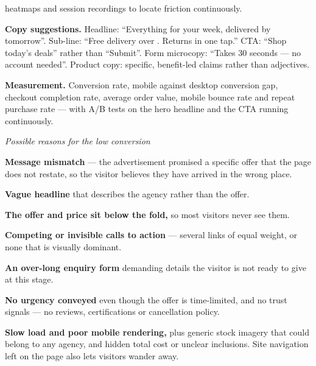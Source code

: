 \begin{qlist}
\begin{apts}
      heatmaps and session recordings to locate friction continuously.
\item \textbf{Copy suggestions.} Headline: ``Everything for your week, delivered
      by tomorrow''. Sub-line: ``Free delivery over . Returns in one
      tap.'' CTA: ``Shop today's deals'' rather than ``Submit''. Form microcopy:
      ``Takes 30 seconds --- no account needed''. Product copy: specific,
      benefit-led claims rather than adjectives.
\item \textbf{Measurement.} Conversion rate, mobile against desktop conversion
      gap, checkout completion rate, average order value, mobile bounce rate and
      repeat purchase rate --- with A/B tests on the hero headline and the CTA
      running continuously.
\end{apts}

\textit{Possible reasons for the low conversion}
\begin{apts}
\item \textbf{Message mismatch} --- the advertisement promised a specific offer
      that the page does not restate, so the visitor believes they have arrived
      in the wrong place.
\item \textbf{Vague headline} that describes the agency rather than the offer.
\item \textbf{The offer and price sit below the fold,} so most visitors never
      see them.
\item \textbf{Competing or invisible calls to action} --- several links of equal
      weight, or none that is visually dominant.
\item \textbf{An over-long enquiry form} demanding details the visitor is not
      ready to give at this stage.
\item \textbf{No urgency conveyed} even though the offer is time-limited, and no
      trust signals --- no reviews, certifications or cancellation policy.
\item \textbf{Slow load and poor mobile rendering,} plus generic stock imagery
      that could belong to any agency, and hidden total cost or unclear
      inclusions. Site navigation left on the page also lets visitors wander
      away.
\end{apts}


\end{qlist}
